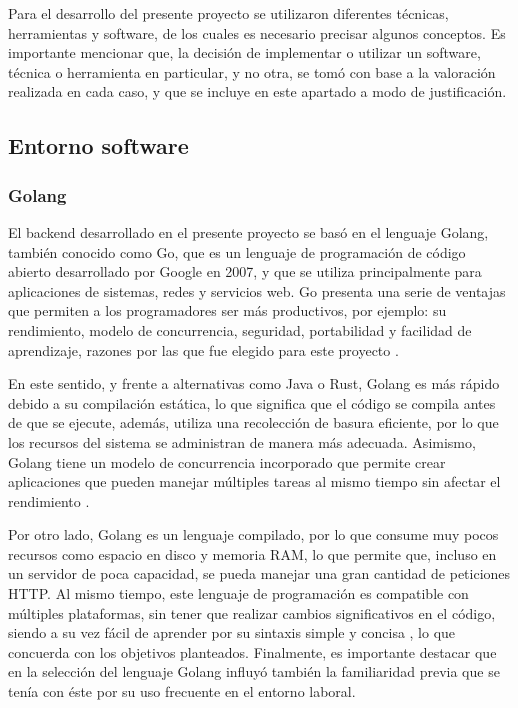 
Para el desarrollo del presente proyecto se utilizaron diferentes técnicas, herramientas y software, de los cuales es necesario precisar algunos conceptos. Es importante mencionar que, la decisión de implementar o utilizar un software, técnica o herramienta en particular, y no otra, se tomó con base a la valoración realizada en cada caso, y que se incluye en este apartado a modo de justificación.

\subsection{Entorno software}

\subsubsection{Golang}

El backend desarrollado en el presente proyecto se basó en el lenguaje Golang, también conocido como Go, que es un lenguaje de programación de código abierto desarrollado por Google en 2007, y que se utiliza principalmente para aplicaciones de sistemas, redes y servicios web. Go presenta una serie de ventajas que permiten a los programadores ser más productivos, por ejemplo: su rendimiento, modelo de concurrencia, seguridad, portabilidad y facilidad de aprendizaje, razones por las que fue elegido para este proyecto \cite{book:golang_donovan}.

En este sentido, y frente a alternativas como Java o Rust, Golang es más rápido debido a su compilación estática, lo que significa que el código se compila antes de que se ejecute, además, utiliza una recolección de basura eficiente, por lo que los recursos del sistema se administran de manera más adecuada. Asimismo, Golang tiene un modelo de concurrencia incorporado que permite crear aplicaciones que pueden manejar múltiples tareas al mismo tiempo sin afectar el rendimiento \cite{book:golang_programacion}. 

Por otro lado, Golang es un lenguaje compilado, por lo que consume muy pocos recursos como espacio en disco y memoria RAM, lo que permite que, incluso en un servidor de poca capacidad, se pueda manejar una gran cantidad de peticiones HTTP. Al mismo tiempo, este lenguaje de programación es compatible con múltiples plataformas, sin tener que realizar cambios significativos en el código, siendo a su vez fácil de aprender por su sintaxis simple y concisa \cite{book:golang_programacion}, lo que concuerda con los objetivos planteados. Finalmente, es importante destacar que en la selección del lenguaje Golang influyó también la familiaridad previa que se tenía con éste por su uso frecuente en el entorno laboral.

